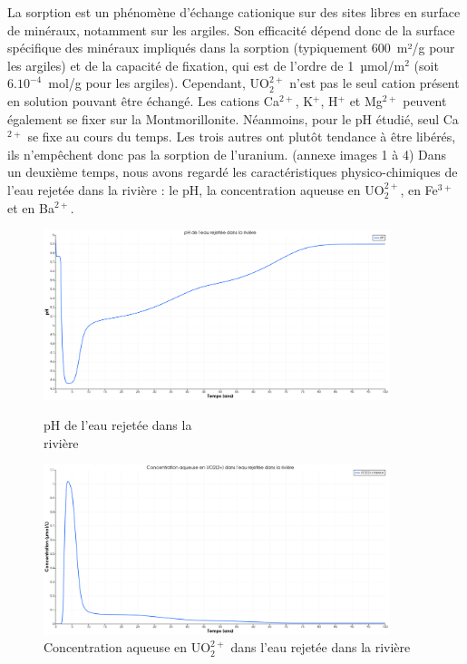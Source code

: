 \documentclass{article}
\begin{document}
La sorption est un phénomène d’échange cationique sur des sites libres en surface de minéraux, notamment sur les argiles. Son efficacité dépend donc de la surface spécifique des minéraux impliqués dans la sorption (typiquement 600~m²/g pour les argiles) et de la capacité de fixation, qui est de l’ordre de 1~µmol/m$^2$ (soit $6 . 10^{-4}$~mol/g pour les argiles). Cependant, UO$_2^{2+}$ n’est pas le seul cation présent en solution pouvant être échangé. Les cations Ca$^{2+}$, K$^{+}$, H$^{+}$ et Mg$^{2+}$ peuvent également se fixer sur la Montmorillonite. Néanmoins, pour le pH étudié, seul Ca$^{2+}$ se fixe au cours du temps. Les trois autres ont plutôt tendance à être libérés, ils n’empêchent donc pas la sorption de l’uranium. (annexe images 1 à 4)
Dans un deuxième temps, nous avons regardé les caractéristiques physico-chimiques de l’eau rejetée dans la rivière : le pH, la concentration aqueuse en UO$_2^{2+}$, en Fe$^{3+}$ et en Ba$^{2+}$.

\begin{figure}[H]
    \centering
    \begin{minipage}{0.5\textwidth}
        \centering
        \includegraphics[width=0.9\textwidth]{III_B_2_5.png} 
        \caption{pH de l'eau rejetée dans la \\rivière}
        \label{fig:pH_sable_Base}
    \end{minipage}\hfill
    \begin{minipage}{0.5\textwidth}
        \centering
        \includegraphics[width=0.9\textwidth]{III_B_2_6.png} 
        \caption{Concentration aqueuse en UO$_2^{2+}$ dans l'eau rejetée dans la rivière}
        \label{fig:UO2_riviere_sable_base}
    \end{minipage}
\end{figure}
\end{document}

